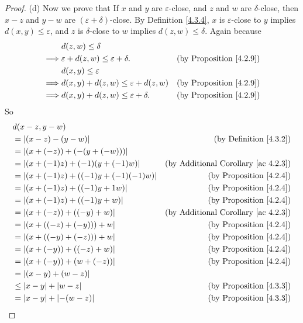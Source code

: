 \begin{proof}{(d)}
Now we prove that If \(x\) and \(y\) are \(\varepsilon\)-close, and \(z\) and \(w\) are \(\delta\)-close, then \(x - z\) and \(y - w\) are \((\varepsilon + \delta)\)-close.
By Definition \ref{4.3.4}, \(x\) is \(\varepsilon\)-close to \(y\) implies \(d(x, y) \leq \varepsilon\), and \(z\) is \(\delta\)-close to \(w\) implies \(d(z, w) \leq \delta\).
Again because
\begin{align*}
& d(z, w) \leq \delta \\
\implies & \varepsilon + d(z, w) \leq \varepsilon + \delta. & \text{(by Proposition \ref{4.2.9})} \\
& d(x, y) \leq \varepsilon \\
\implies & d(x, y) + d(z, w) \leq \varepsilon + d(z, w) & \text{(by Proposition \ref{4.2.9})} \\
\implies & d(x, y) + d(z, w) \leq \varepsilon + \delta. & \text{(by Proposition \ref{4.2.9})}
\end{align*}
So
\begin{align*}
& d(x - z, y - w) \\
&= \abs*{(x - z) - (y - w)} & \text{(by Definition \ref{4.3.2})} \\
&= \abs*{(x + (-z)) + (-(y + (-w)))} \\
&= \abs*{(x + (-1)z) + (-1)(y + (-1)w)} & \text{(by Additional Corollary \ref{ac 4.2.3})} \\
&= \abs*{(x + (-1)z) + ((-1)y + (-1)(-1)w)} & \text{(by Proposition \ref{4.2.4})} \\
&= \abs*{(x + (-1)z) + ((-1)y + 1w)} & \text{(by Proposition \ref{4.2.4})} \\
&= \abs*{(x + (-1)z) + ((-1)y + w)} & \text{(by Proposition \ref{4.2.4})} \\
&= \abs*{(x + (-z)) + ((-y) + w)} & \text{(by Additional Corollary \ref{ac 4.2.3})} \\
&= \abs*{(x + ((-z) + (-y))) + w} & \text{(by Proposition \ref{4.2.4})} \\
&= \abs*{(x + ((-y) + (-z))) + w} & \text{(by Proposition \ref{4.2.4})} \\
&= \abs*{(x + (-y)) + ((-z) + w)} & \text{(by Proposition \ref{4.2.4})} \\
&= \abs*{(x + (-y)) + (w + (-z))} & \text{(by Proposition \ref{4.2.4})} \\
&= \abs*{(x - y) + (w - z)} \\
&\leq \abs*{x - y} + \abs*{w - z} & \text{(by Proposition \ref{4.3.3})} \\
&= \abs*{x - y} + \abs*{-(w - z)} & \text{(by Proposition \ref{4.3.3})} \\

\end{align*}
\end{proof}
